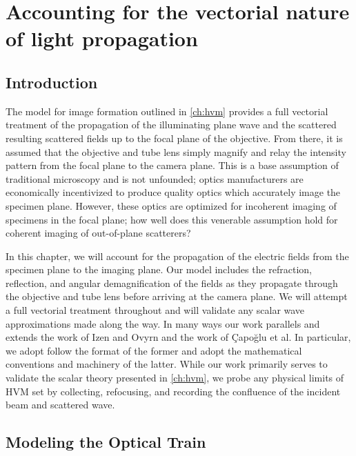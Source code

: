 \chapter{Accounting for the vectorial nature of light propagation}
\label{ch:debye}




\section{Introduction}

The model for image formation outlined in \autoref{ch:hvm} provides a full
vectorial treatment of the propagation of the illuminating plane wave and
the scattered resulting scattered fields
up to the focal plane of the objective. From there, it is assumed that the
objective and tube lens simply magnify and relay the intensity pattern from
the focal plane to the camera plane.
This is a base assumption of traditional microscopy and is not unfounded; optics
manufacturers are economically incentivized to produce quality optics which
accurately image the specimen plane. However, these optics are optimized for
incoherent imaging of specimens in the focal plane;
how well does this venerable assumption hold for coherent imaging of out-of-plane
scatterers?

In this chapter, we will account for the propagation of the electric fields from
the specimen plane to the imaging plane. Our model includes the
refraction, reflection, and angular demagnification of the fields as they propagate
through the objective and tube lens before arriving at the camera plane.
We will attempt a full vectorial treatment throughout and will
validate any scalar wave approximations made along the way. In many ways our work
parallels and extends the work of Izen and Ovyrn\cite{izen00} and the work of
\c{C}apo\u{g}lu\cite{capoglu12} et al. In particular, we adopt follow the format of the
former and adopt the mathematical conventions and machinery of the latter.
While our work primarily serves to validate the scalar theory
presented in \autoref{ch:hvm}, we probe any physical limits
of HVM set by collecting, refocusing, and recording the confluence of the incident
beam and scattered wave.


\section{Modeling the Optical Train}

